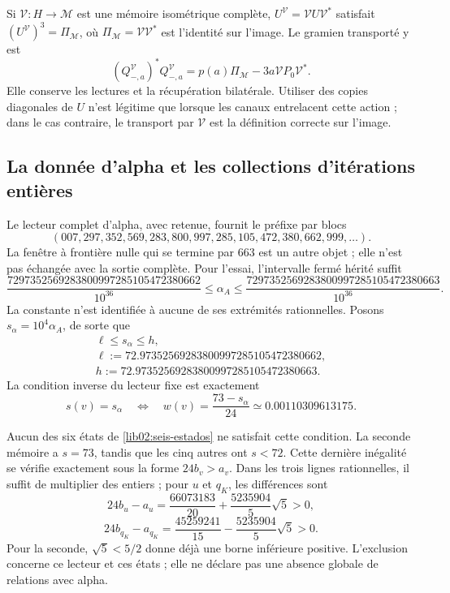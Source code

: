 Si \(\mathcal V:H\to\mathcal M\) est une mémoire isométrique
complète, \(U^{\mathcal V}=\mathcal VU\mathcal V^*\) satisfait
\((U^{\mathcal V})^3=\Pi_{\mathcal M}\), où
\(\Pi_{\mathcal M}=\mathcal V\mathcal V^*\) est l’identité sur
l’image. Le gramien transporté y est
\[
 (Q_{-,a}^{\mathcal V})^*Q_{-,a}^{\mathcal V}
 =p(a)\Pi_{\mathcal M}-3a\mathcal VP_0\mathcal V^*.
\]
Elle conserve les lectures et la récupération bilatérale. Utiliser des copies diagonales de \(U\) n'est légitime que lorsque les canaux entrelacent cette action ; dans le cas contraire, le transport par \(\mathcal V\) est la définition correcte sur l'image.

\subsection{La donnée d’alpha et les collections d’itérations entières}
\label{lib02:ensayo-inverso}

Le lecteur complet d’alpha, avec retenue, fournit le préfixe par
blocs
\[
 (007,297,352,569,283,800,997,285,105,472,380,662,999,\ldots).
\]
La fenêtre à frontière nulle qui se termine par 663 est un autre objet ; elle n’est pas
échangée avec la sortie complète. Pour l’essai, l’intervalle
fermé hérité suffit
\begin{equation}
 \frac{7297352569283800997285105472380662}{10^{36}}
 \leq\alpha_A\leq
 \frac{7297352569283800997285105472380663}{10^{36}}.
 \label{lib02:intervalo-alpha}
\end{equation}
La constante n'est identifiée à aucune de ses extrémités rationnelles. Posons \(s_\alpha=10^4\alpha_A\), de sorte que
\begin{equation}
 \begin{gathered}
 \ell\leq s_\alpha\leq h,\\
 \ell:=72.97352569283800997285105472380662,\\
 h:=72.97352569283800997285105472380663.
 \end{gathered}
 \label{lib02:intervalo-s}
\end{equation}
La condition inverse du lecteur fixe est exactement
\begin{equation}
 s(v)=s_\alpha
 \quad\Longleftrightarrow\quad
 w(v)=\frac{73-s_\alpha}{24}
 \simeq0.00110309613175.
 \label{lib02:criterio-alpha}
\end{equation}

Aucun des six états de \cref{lib02:seis-estados} ne satisfait cette
condition. La seconde mémoire a \(s=73\), tandis que les cinq autres
ont \(s<72\). Cette dernière inégalité se vérifie exactement
sous la forme \(24b_v>a_v\). Dans les trois lignes rationnelles, il suffit de multiplier des
entiers ; pour \(u\) et \(q_K\), les différences sont
\[
 24b_u-a_u=\frac{66073183}{20}+\frac{5235904}{5}\sqrt5>0,
\]
\[
 24b_{q_K}-a_{q_K}
 =\frac{45259241}{15}-\frac{5235904}{5}\sqrt5>0.
\]
Pour la seconde, \(\sqrt5<5/2\) donne déjà une borne inférieure positive. L'exclusion concerne ce lecteur et ces états ; elle ne déclare pas une absence globale de relations avec alpha.

